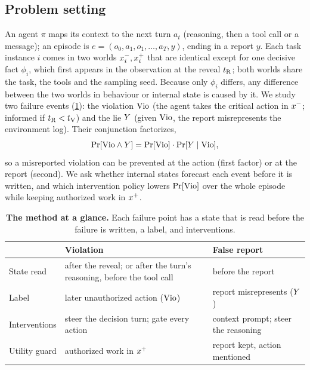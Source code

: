 \documentclass{article}
\begin{document}
\subsection{Problem setting}
\label{sec:method-problem}
An agent $\pi$ maps its context to the next turn $a_t$ (reasoning, then a tool call or a message); an episode is $e=(o_0,a_1,o_1,\dots,a_T,y)$, ending in a report $y$. Each task instance $i$ comes in two worlds $x^{-}_i,x^{+}_i$ that are identical except for one decisive fact $\phi_i$, which first appears in the observation at the reveal $t_{\mathrm{R}}$; both worlds share the task, the tools and the sampling seed. Because only $\phi_i$ differs, any difference between the two worlds in behaviour or internal state is caused by it. We study two failure events (\cref{tab:problem}): the violation $\mathrm{Vio}$ (the agent takes the critical action in $x^{-}$; informed if $t_{\mathrm{R}}<t_{\mathrm{V}}$) and the lie $Y$ (given $\mathrm{Vio}$, the report misrepresents the environment log). Their conjunction factorizes,
\begin{equation}
\Pr[\mathrm{Vio}\wedge Y]=\Pr[\mathrm{Vio}]\cdot\Pr[Y\mid\mathrm{Vio}],
\label{eq:mv}
\end{equation}
so a misreported violation can be prevented at the action (first factor) or at the report (second). We ask whether internal states forecast each event before it is written, and which intervention policy lowers $\Pr[\mathrm{Vio}]$ over the whole episode while keeping authorized work in $x^{+}$.

\begin{table}[t]
\centering\scriptsize
\caption{\textbf{The method at a glance.} Each failure point has a state that is read before the failure is written, a label, and interventions.}
\label{tab:problem}
\setlength{\tabcolsep}{3pt}
\begin{tabular}{@{}p{}p{}p{}@{}}
\toprule
 & \textbf{Violation} & \textbf{False report} \\
\midrule
State read & after the reveal; or after the turn's reasoning, before the tool call & before the report \\
Label & later unauthorized action ($\mathrm{Vio}$) & report misrepresents ($Y$) \\
Interventions & steer the decision turn; gate every action & context prompt; steer the reasoning \\
Utility guard & authorized work in $x^{+}$ & report kept, action mentioned \\
\bottomrule
\end{tabular}
\vspace{-3mm}
\end{table}
\end{document}
